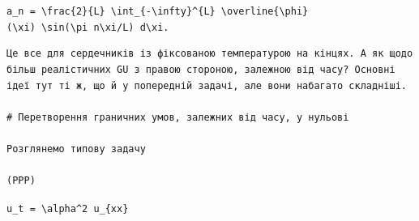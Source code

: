 \documentclass[
  ukrainian,
]{article}
\begin{document}
\texttt{a\_n\ =\ \textbackslash{}frac\{2\}\{L\}\ \textbackslash{}int\_\{-\textbackslash{}infty\}\^{}\{L\}\ \textbackslash{}overline\{\textbackslash{}phi\}(\textbackslash{}xi)\ \textbackslash{}sin(\textbackslash{}pi\ n\textbackslash{}xi/L)\ d\textbackslash{}xi.}

\begin{verbatim}
Це все для сердечників із фіксованою температурою на кінцях. А як щодо більш реалістичних GU з правою стороною, залежною від часу? Основні ідеї тут ті ж, що й у попередній задачі, але вони набагато складніші.

# Перетворення граничних умов, залежних від часу, у нульові

Розглянемо типову задачу

(PPP)
\end{verbatim}

\texttt{u\_t\ =\ \textbackslash{}alpha\^{}2\ u\_\{xx\}}
\end{document}
